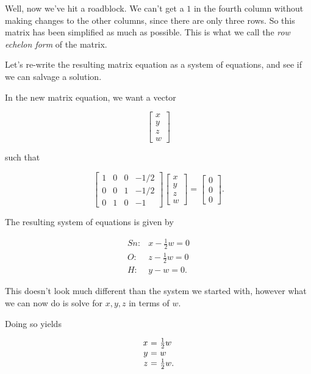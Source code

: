 \documentclass{ximera}
\begin{document}
\begin{exploration}
\begin{example}
Well, now we've hit a roadblock. We can't get a $1$ in the fourth column without making changes to the other columns, since there are only three rows. So this matrix has been simplified as much as possible. This is what we call the \emph{row echelon form} of the matrix.

Let's re-write the resulting matrix equation as a system of equations, and see if we can salvage a solution.

In the new matrix equation, we want a vector 

$$\begin{bmatrix} x \\ y \\ z \\ w \end{bmatrix}$$

such that

$$\begin{bmatrix}
    1 & 0 & 0 & -1/2 \\
    0 & 0 & 1 & -1/2 \\
    0 & 1 & 0 & -1
  \end{bmatrix} \begin{bmatrix} x \\ y \\ z \\ w \end{bmatrix} = \begin{bmatrix} 0 \\ 0 \\ 0 \end{bmatrix}.$$


The resulting system of equations is given by

\begin{equation*}
  \begin{array}{cl}
    Sn: & x - \frac{1}{2}w = 0 \\
    O: & z - \frac{1}{2}w = 0 \\
    H: & y - w = 0.
  \end{array}
\end{equation*}

This doesn't look much different than the system we started with, however what we can now do is solve for $x,y,z$ in terms of $w$. 

Doing so yields

\begin{equation*}
  \begin{array}{r@{~}c@{~}l}
    x &=& \frac{1}{2}w \\
    y &=& w \\
    z &=& \frac{1}{2}w.
  \end{array}
\end{equation*}


\end{example}
\end{exploration}
\end{document}
